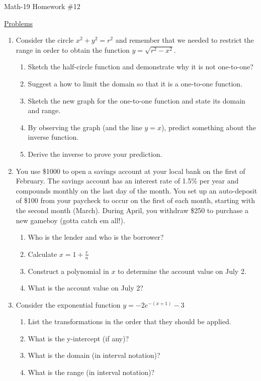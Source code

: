\documentclass[letterpaper,12pt,fleqn]{article}
\begin{document}
\begin{center}
\Large Math-19 Homework \#12
\end{center}

\vspace{0.5in}

\underline{Problems}

\begin{enumerate}

\item Consider the circle $x^2+y^2=r^2$ and remember that we needed to restrict
  the range in order to obtain the function $y=\sqrt{r^2-x^2}$.
  \begin{enumerate}
  \item Sketch the half-circle function and demonstrate why it is not
    one-to-one?
  \item Suggest a how to limit the domain so that it is a one-to-one function.
  \item Sketch the new graph for the one-to-one function and state its domain
    and range.
  \item By observing the graph (and the line $y=x$), predict something about the
    inverse function.
  \item Derive the inverse to prove your prediction.
  \end{enumerate}
  
\item You use \$1000 to open a savings account at your local bank on the first
  of February. The savings account has an interest rate of 1.5\% per year and
  compounds monthly on the last day of the month. You set up an auto-deposit
  of \$100 from your paycheck to occur on the first of each month, starting
  with the second month (March).  During April, you withdraw \$250 to
  purchase a new gameboy (gotta catch em all!).
  \begin{enumerate}
  \item Who is the lender and who is the borrower?
  \item Calculate $x=1+\frac{r}{n}$
  \item Construct a polynomial in $x$ to determine the account value on
    July 2.
  \item What is the account value on July 2?
  \end{enumerate}

\item Consider the exponential function $y=-2e^{-(x+1)}-3$
  \begin{enumerate}
  \item List the transformations in the order that they should be applied.
  \item What is the y-intercept (if any)?
  \item What is the domain (in interval notation)?
  \item What is the range (in interval notation)?
  \end{enumerate}


\end{enumerate}
\end{document}
